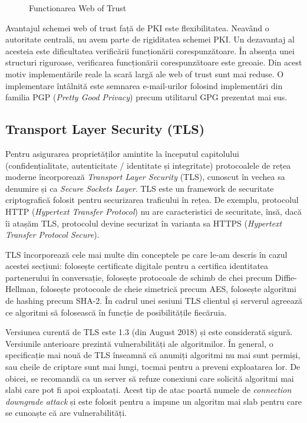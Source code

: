 \begin{figure}[htbp]
  \centering
  \def\svgwidth{\columnwidth}
  
  \caption{Functionarea Web of Trust}
  \label{fig:sec:web-of-trust}
\end{figure}

Avantajul schemei web of trust față de PKI este flexibilitatea. Neavând o autoritate centrală, nu avem parte de rigiditatea schemei PKI. Un dezavantaj al acesteia este dificultatea verificării funcționării corespunzătoare. În absența unei structuri riguroase, verificarea funcționării corespunzătoare este greoaie. Din acest motiv implementările reale la scară largă ale web of trust sunt mai reduse. O implementare întâlnită este semnarea e-mail-urilor folosind implementări din familia PGP (\textit{Pretty Good Privacy}) precum utilitarul GPG prezentat mai sus.

\subsection{Transport Layer Security (TLS)}
\label{sec:sec:transfer:tls}

Pentru asigurarea proprietăților amintite la începutul capitolului (confidențialitate, autenticitate / identitate și integritate) protocoalele de rețea moderne încorporează \textit{Transport Layer Security} (TLS), cunoscut în vechea sa denumire și ca \textit{Secure Sockets Layer}. TLS este un framework de securitate criptografică folosit pentru securizarea traficului în rețea. De exemplu, protocolul HTTP (\textit{Hypertext Transfer Protocol}) nu are caracteristici de securitate, însă, dacă îi atașăm TLS, protocolul devine securizat în varianta sa HTTPS (\textit{Hypertext Transfer Protocol Secure}).

TLS încorporează cele mai multe din conceptele pe care le-am descris în cazul acestei secțiuni: folosește certificate digitale pentru a certifica identitatea partenerului în conversație, folosește protocoale de schimb de chei precum Diffie-Hellman, folosește protocoale de cheie simetrică precum AES, folosește algoritmi de hashing precum SHA-2. În cadrul unei sesiuni TLS clientul și serverul agreează ce algoritmi să folosească în funcție de posibilitățile fiecăruia.

Versiunea curentă de TLS este 1.3 (din August 2018) și este considerată sigură. Versiunile anterioare prezintă vulnerabilități ale algoritmilor. În general, o specificație mai nouă de TLS înseamnă că anumiți algoritmi nu mai sunt permiși, sau cheile de criptare sunt mai lungi, tocmai pentru a preveni exploatarea lor. De obicei, se recomandă ca un server să refuze conexiuni care solicită algoritmi mai slabi care pot fi apoi exploatați. Acest tip de atac poartă numele de \textit{connection downgrade attack} și este folosit pentru a impune un algoritm mai slab pentru care se cunoaște că are vulnerabilități.


